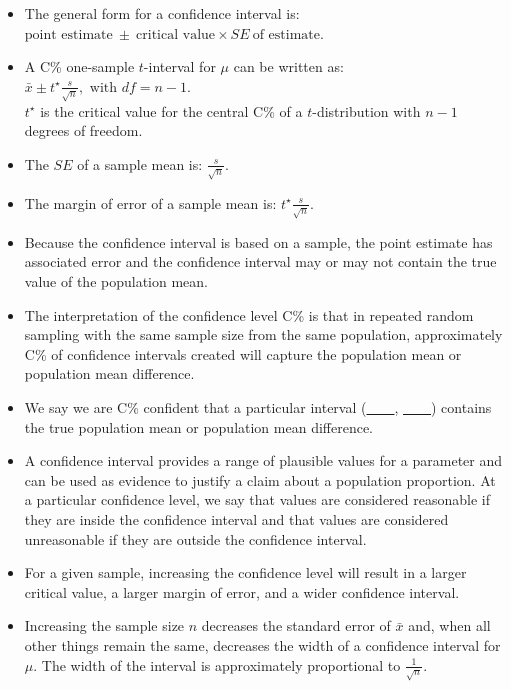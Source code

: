 \begin{itemize}
\item The general form for a confidence interval is:  $\text{point estimate}\ \pm\ \text{critical value} \times SE\ \text{of estimate}$.

\item A C\% one-sample $t$-interval for $\mu$ can be written as: $\bar{x} \pm t^{\star}\frac{s}{\sqrt{n}}, \text{ with } df=n-1$.\\
$t^{\star}$ is the critical value for the central C\% of a $t$-distribution with $n-1$ degrees of freedom.  

\item The $SE$ of a sample mean is:  $\frac{s}{\sqrt{n}}$.

\item The margin of error of a sample mean is:  $t^{\star}\frac{s}{\sqrt{n}}$. 

\item Because the confidence interval is based on a sample, the point estimate has associated error and the confidence interval may or may not contain the true value of the population mean.  

\item The interpretation of the confidence level C\% is that in repeated random
sampling with the same sample size from the same population, approximately
C\% of confidence intervals created will capture the population mean or
population mean difference.

\item We say we are C\% confident that a particular interval (\underline{\ \ \ \ }, \underline{\ \ \ \ }) contains the true population mean or population mean difference.

\item A confidence interval provides a range of plausible values for a parameter and can be used as evidence to justify a claim about a population proportion.  At a particular confidence level, we say that values are considered reasonable if they are inside the confidence interval and that values are considered unreasonable if they are outside the confidence interval. 

\item For a given sample, increasing the confidence level will result in a larger critical value, a larger margin of error, and a wider confidence interval.

\item Increasing the sample size $n$ decreases the standard error of $\bar{x}$ and, when all other things remain the same, decreases the width of a confidence interval for $\mu$.  The width of the interval is approximately proportional to $\frac{1}{\sqrt{n}}$.

\end{itemize}


